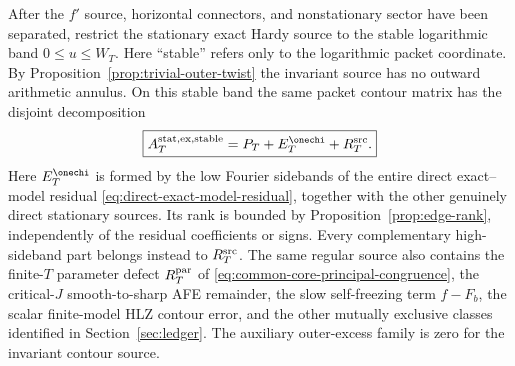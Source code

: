 \begin{proposition}
\label{prop:uniform-twisted-replacement}
After the $f'$ source, horizontal connectors, and nonstationary sector have
been separated, restrict the stationary exact Hardy source to the stable
logarithmic band $0\le u\le W_T$. Here ``stable'' refers only to the logarithmic
packet coordinate. By Proposition~\ref{prop:trivial-outer-twist} the invariant
source has no outward arithmetic annulus. On this stable band the same packet contour
matrix has the disjoint decomposition
\begin{equation}
\boxed{
A_{T}^{\rm stat,ex,stable}=P_T+E_T^{\onechi}+R_T^{\rm src}.
}
\label{eq:uniform-twisted-replacement}
\end{equation}
Here $E_T^{\onechi}$ is formed by the low Fourier sidebands of the entire
direct exact--model residual \eqref{eq:direct-exact-model-residual}, together
with the other genuinely direct stationary sources.  Its rank is bounded by
Proposition~\ref{prop:edge-rank}, independently of the residual coefficients or
signs.  Every complementary high-sideband part belongs instead to
$R_T^{\rm src}$.  The same regular source also contains the finite-$T$
parameter defect $R_T^{\rm par}$ of
\eqref{eq:common-core-principal-congruence}, the critical-$J$ smooth-to-sharp
AFE remainder, the slow self-freezing term $f-F_b$, the scalar finite-model HLZ
contour error, and the other mutually exclusive classes identified in
Section~\ref{sec:ledger}.  The auxiliary outer-excess family is zero for the
invariant contour source.
\end{proposition}

